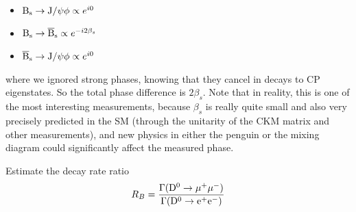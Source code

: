 {\begin{itemize}
\item ${\rm B_s \to J/\psi \phi} \propto e^{i0}$
\item ${\rm B_s \to \overline{B}_s} \propto e^{-i 2 \beta_s}$
\item ${\rm \overline{B}_s \to J/\psi \phi} \propto e^{i0}$
\end{itemize}
where we ignored strong phases, knowing that they cancel in decays to CP eigenstates. So the total phase difference is $2\beta_s$. Note that in reality, this is one of the most interesting measurements, because $\beta_s$ is really quite small and also very precisely predicted in the SM (through the unitarity of the CKM matrix and other measurements), and new physics in either the penguin or the mixing diagram could significantly affect the measured phase.
}

Estimate the decay rate ratio
\[
R_{B} = \frac{\Gamma({\rm D^0 \to \mu^+\mu^-})}{\Gamma({\rm D^0 \to e^+e^-})}
\]
